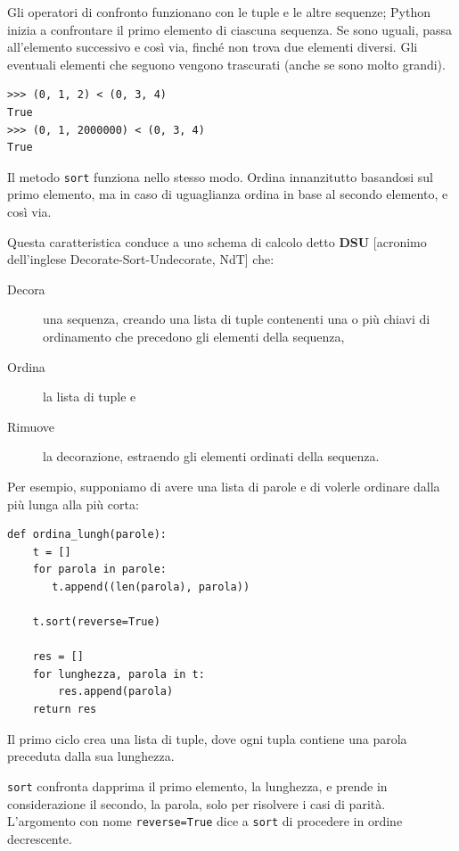 \documentclass[10pt]{book}
\begin{document}
Gli operatori di confronto funzionano con le tuple e le altre sequenze; Python inizia a confrontare il primo elemento di ciascuna sequenza. Se sono uguali, passa all'elemento successivo e così via, finché non trova due elementi diversi. Gli eventuali elementi che seguono vengono trascurati (anche se sono molto grandi).

\begin{verbatim}
>>> (0, 1, 2) < (0, 3, 4)
True
>>> (0, 1, 2000000) < (0, 3, 4)
True
\end{verbatim}
%
Il metodo {\tt sort} funziona nello stesso modo. Ordina innanzitutto basandosi sul primo elemento, ma in caso di uguaglianza ordina in base al secondo elemento, e così via. 

Questa caratteristica conduce a uno schema di calcolo detto {\bf DSU} [acronimo dell'inglese Decorate-Sort-Undecorate, NdT] che:

\begin{description}

\item[Decora] una sequenza, creando una lista di tuple contenenti una o più chiavi di ordinamento che precedono gli elementi della sequenza,

\item[Ordina] la lista di tuple e

\item[Rimuove] la decorazione, estraendo gli elementi ordinati della sequenza.

\end{description}

\label{DSU}

Per esempio, supponiamo di avere una lista di parole e di volerle ordinare dalla più lunga alla più corta:

\begin{verbatim}
def ordina_lungh(parole):
    t = []
    for parola in parole:
       t.append((len(parola), parola))

    t.sort(reverse=True)

    res = []
    for lunghezza, parola in t:
        res.append(parola)
    return res
\end{verbatim}
%
Il primo ciclo crea una lista di tuple, dove ogni tupla contiene una parola preceduta dalla sua lunghezza.

{\tt sort} confronta dapprima il primo elemento, la lunghezza, e prende in considerazione il secondo, la parola, solo per risolvere i casi di parità. L'argomento con nome {\tt reverse=True} dice a {\tt sort} di procedere in ordine decrescente.
\end{document}
